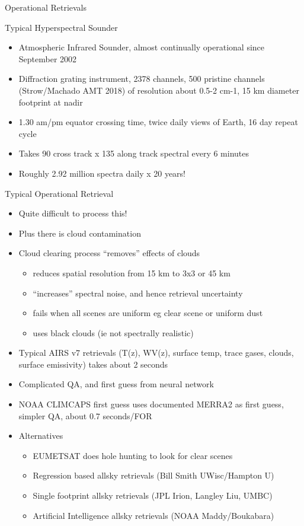 \documentclass[10pt,t]{beamer}
\begin{document}
\begin{frame}[shrink=2]{Operational Retrievals}
\begin{block}{Typical Hyperspectral Sounder}
  \begin{itemize}
  \item Atmospheric Infrared Sounder, almost continually operational since September 2002
  \item Diffraction grating instrument, 2378 channels, 500 pristine channels 
        (Strow/Machado AMT 2018) of resolution about 0.5-2 cm-1, 15 km diameter footprint at nadir
  \item 1.30 am/pm equator crossing time, twice daily views of Earth, 16 day repeat cycle
  \item Takes 90 cross track x 135 along track spectral every 6 minutes
  \item Roughly 2.92 million spectra daily x 20 years!
  \end{itemize}
\end{block}

\begin{block}{Typical Operational Retrieval}
  \begin{itemize}
    \item Quite difficult to process this! 
    \item Plus there is cloud contamination
    \item Cloud clearing process ``removes'' effects of clouds
       \begin{itemize}
          \item reduces spatial resolution from 15 km to 3x3 or 45 km
          \item ``increases'' spectral noise, and hence retrieval uncertainty
          \item fails when all scenes are uniform eg clear scene or uniform dust
          \item uses black clouds (ie not spectrally realistic)
       \end{itemize}
    \item Typical AIRS v7 retrievals (T(z), WV(z), surface temp, trace gases, clouds, surface emissivity) takes about 2 seconds
    \item Complicated QA, and first guess from neural network
    \item NOAA CLIMCAPS first guess uses documented MERRA2 as first guess, simpler QA, about 0.7 seconds/FOR
    \item Alternatives
    \begin{itemize}
      \item EUMETSAT does hole hunting to look for clear scenes
      \item Regression based allsky retrievals (Bill Smith UWisc/Hampton U)
      \item Single footprint allsky retrievals (JPL Irion, Langley Liu, UMBC)
      \item Artificial Intelligence allsky retrievals (NOAA Maddy/Boukabara)
    \end{itemize}
  \end{itemize}
\end{block}
\end{frame}
  
\end{document}
